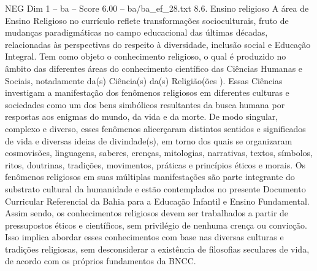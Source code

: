 \begin{textsample}{NEG Dim 1 – ba – Score 6.00 – ba/ba\_ef\_28.txt}  \label{ex:f1_neg_189}
8.6.
Ensino religioso A área de Ensino Religioso no currículo reflete transformações socioculturais, fruto de mudanças paradigmáticas no campo educacional das últimas décadas, relacionadas às perspectivas do respeito à diversidade, inclusão social e Educação Integral.
Tem como objeto o conhecimento religioso, o qual é produzido no âmbito das diferentes áreas do conhecimento científico das Ciências Humanas e Sociais, notadamente da(s) Ciência(s) da(s) Religião(ões ).
Essas Ciências investigam a manifestação dos fenômenos religiosos em diferentes culturas e sociedades como um dos bens simbólicos resultantes da busca humana por respostas aos enigmas do mundo, da vida e da morte.
De modo singular, complexo e diverso, esses fenômenos alicerçaram distintos sentidos e significados de vida e diversas ideias de divindade(s), em torno dos quais se organizaram cosmovisões, linguagens, saberes, crenças, mitologias, narrativas, textos, símbolos, ritos, doutrinas, tradições, movimentos, práticas e princípios éticos e morais.
Os fenômenos religiosos em suas múltiplas manifestações são parte integrante do substrato cultural da humanidade e estão contemplados no presente Documento Curricular Referencial da Bahia para a Educação Infantil e Ensino Fundamental.
Assim sendo, os conhecimentos religiosos devem ser trabalhados a partir de pressupostos éticos e científicos, sem privilégio de nenhuma crença ou convicção.
Isso implica abordar esses conhecimentos com base nas diversas culturas e tradições religiosas, sem desconsiderar a existência de filosofias seculares de vida, de acordo com os próprios fundamentos da BNCC.

\end{textsample}
